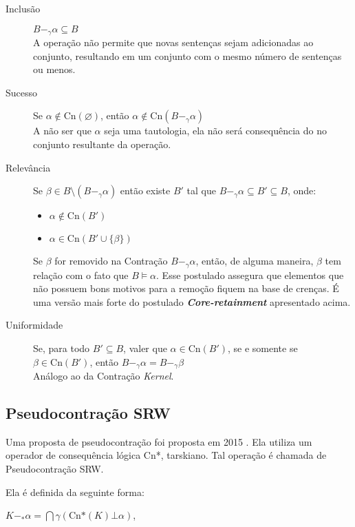 \begin{description}
	\item[Inclusão] $ B -_{\gamma} \alpha \subseteq B$ \\ A operação não permite que novas sentenças sejam adicionadas ao conjunto, resultando em um conjunto com o mesmo número de sentenças ou menos.
	\item[Sucesso] Se $ \alpha \notin \text{Cn}(\varnothing) $, então $ \alpha \notin \text{Cn}(B -_{\gamma} \alpha) $ \\ A não ser que $ \alpha $ seja uma tautologia, ela não será consequência do no conjunto resultante da operação.
	\item[Relevância] Se $ \beta \in B \setminus (B -_{\gamma} \alpha) $ então existe  $ B' $ tal que $B -_{\gamma} \alpha \subseteq B' \subseteq B $, onde:
	\begin{itemize}
		\item $ \alpha \notin \text{Cn}(B') $
		\item $ \alpha \in \text{Cn}(B' \cup \{\beta\}) $ 
	\end{itemize}
	Se $ \beta $ for removido na Contração $ B -_{\gamma} \alpha $, então, de alguma maneira, $ \beta $ tem relação com o fato que $ B \models \alpha$. Esse postulado assegura que elementos que não possuem bons motivos para a remoção fiquem na base de crenças. É uma versão mais forte do postulado \textbf{\textit{Core-retainment}} apresentado acima.
	\item[Uniformidade] Se, para todo $B' \subseteq B $, valer que $ \alpha \in \text{Cn}(B') $, se e somente se $ \beta \in \text{Cn}(B') $, então $ B -_{\gamma} \alpha = B -_{\gamma} \beta $ \\
	Análogo ao da Contração \textit{Kernel}. 
	
\end{description}

\subsection{Pseudocontração SRW}

Uma proposta de pseudocontração foi proposta em 2015 \citep{revisaoSantos}. Ela utiliza um operador de consequência lógica Cn*, tarskiano. Tal operação é chamada de Pseudocontração SRW. 

Ela é definida da seguinte forma:

\begin{center}
	$ K -_* \alpha = \bigcap \gamma(\text{Cn*}(K) \bot \alpha) $,
\end{center}

